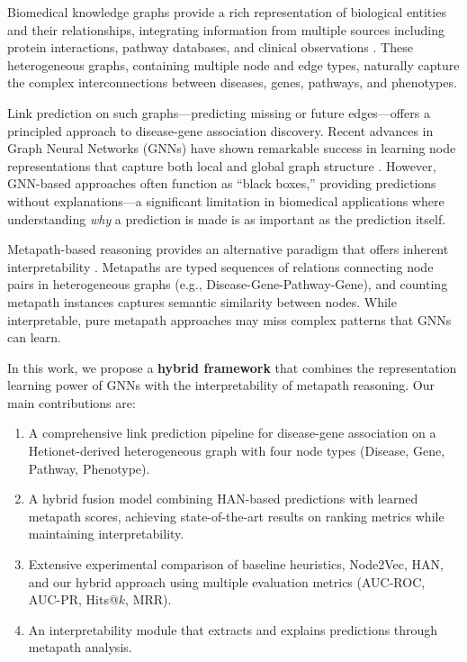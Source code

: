 \documentclass{article}
\begin{document}
Biomedical knowledge graphs provide a rich representation of biological entities and their relationships, integrating information from multiple sources including protein interactions, pathway databases, and clinical observations \citep{himmelstein2017systematic}. These heterogeneous graphs, containing multiple node and edge types, naturally capture the complex interconnections between diseases, genes, pathways, and phenotypes.

Link prediction on such graphs---predicting missing or future edges---offers a principled approach to disease-gene association discovery. Recent advances in Graph Neural Networks (GNNs) have shown remarkable success in learning node representations that capture both local and global graph structure \citep{hamilton2020graph}. However, GNN-based approaches often function as ``black boxes,'' providing predictions without explanations---a significant limitation in biomedical applications where understanding \emph{why} a prediction is made is as important as the prediction itself.

Metapath-based reasoning provides an alternative paradigm that offers inherent interpretability \citep{sun2011pathsim}. Metapaths are typed sequences of relations connecting node pairs in heterogeneous graphs (e.g., Disease-Gene-Pathway-Gene), and counting metapath instances captures semantic similarity between nodes. While interpretable, pure metapath approaches may miss complex patterns that GNNs can learn.

In this work, we propose a \textbf{hybrid framework} that combines the representation learning power of GNNs with the interpretability of metapath reasoning. Our main contributions are:

\begin{enumerate}
    \item A comprehensive link prediction pipeline for disease-gene association on a Hetionet-derived heterogeneous graph with four node types (Disease, Gene, Pathway, Phenotype).

    \item A hybrid fusion model combining HAN-based predictions with learned metapath scores, achieving state-of-the-art results on ranking metrics while maintaining interpretability.

    \item Extensive experimental comparison of baseline heuristics, Node2Vec, HAN, and our hybrid approach using multiple evaluation metrics (AUC-ROC, AUC-PR, Hits@$k$, MRR).

    \item An interpretability module that extracts and explains predictions through metapath analysis.
\end{enumerate}
\end{document}
